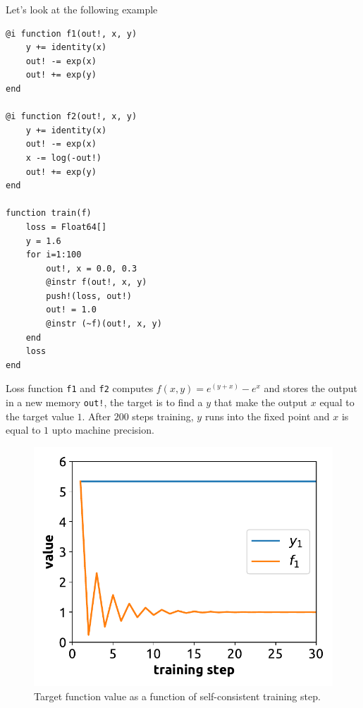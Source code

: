 \documentclass[aps,twocolumn,longbibliography,english,superscriptaddress,prr]{revtex4-1}
\newcommand{\<}{\langle}
\renewcommand{\>}{\rangle}
\theoremstyle{definition}\newtheorem{definition}{\textit{Definition}}
\begin{document}
Let's look at the following example
\begin{minipage}{.44\textwidth}
\begin{lstlisting}[basicstyle=\small\ttfamily,columns=fullflexible]
@i function f1(out!, x, y)
    y += identity(x)
    out! -= exp(x)
    out! += exp(y)
end

@i function f2(out!, x, y)
    y += identity(x)
    out! -= exp(x)
    x -= log(-out!)
    out! += exp(y)
end

function train(f)
    loss = Float64[]
    y = 1.6
    for i=1:100
        out!, x = 0.0, 0.3
        @instr f(out!, x, y)
        push!(loss, out!)
        out! = 1.0
        @instr (~f)(out!, x, y)
    end
    loss
end
\end{lstlisting}
\end{minipage}

Loss function \texttt{f1} and \texttt{f2} computes $f(x, y) = e^{(y+x)} - e^x$ and stores the output in a new memory \texttt{out!}, the target is to find a $y$ that make the output $x$ equal to the target value $1$.
After $200$ steps training, $y$ runs into the fixed point and $x$ is equal to $1$ upto machine precision.

\begin{figure}
    \centerline{\includegraphics[width=\columnwidth,trim={0 0 0 0},clip]{images/fig1.pdf}}
    \caption{Target function value as a function of self-consistent training step.}\label{fig:invtrain}
\end{figure}
\end{document}
